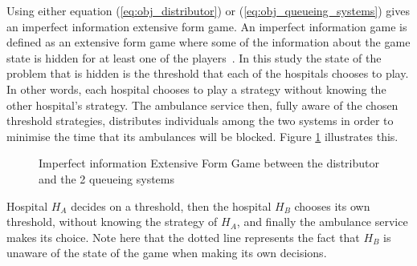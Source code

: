 Using either equation (\ref{eq:obj_distributor}) or 
(\ref{eq:obj_queueing_systems}) gives an imperfect information extensive form 
game. 
An imperfect information game is defined as an extensive form game where some 
of the information about the game state is hidden for at least one of the 
players~\cite{Berwanger2008}. In this study the state of the problem that is
hidden is the threshold that each of the hospitals chooses to play.
In other words, each hospital chooses to play a strategy without 
knowing the other hospital's strategy.
The ambulance service then, fully aware of the chosen threshold strategies, 
distributes individuals among the two systems in order to minimise the time 
that its ambulances will be blocked. 
Figure \ref{fig:imperfect_info_game} illustrates this. 

\begin{figure}[ht]
    \centering
    \caption{Imperfect information Extensive Form Game between the distributor 
    and the 2 queueing systems}
    \label{fig:imperfect_info_game}
\end{figure}

Hospital \(H_A\) decides on a threshold, then the hospital \(H_B\)
chooses its own threshold, without knowing the strategy of \(H_A\), and finally
the ambulance service makes its choice. 
Note here that the dotted line represents the
fact that \(H_B\) is unaware of the state of the game when making its own 
decisions. 

